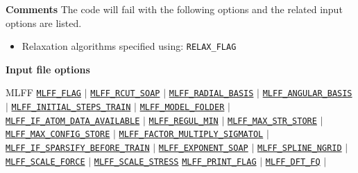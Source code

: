 \begin{frame}[allowframebreaks]{\textbf{Comments}} \label{Introduction}
The code will fail with the following options and the related input options are listed.
\begin{itemize}
  \item Relaxation algorithms specified using: \texttt{RELAX\_FLAG}
\end{itemize}

\end{frame}

\begin{frame}[allowframebreaks]{\textbf{Input file options}} \label{Index}
\vspace{-2mm}
 \begin{block}{MLFF}
\hyperlink{MLFF_FLAG}{\texttt{MLFF\_FLAG}} $\vert$
\hyperlink{MLFF_RCUT_SOAP}{\texttt{MLFF\_RCUT\_SOAP}} $\vert$
\hyperlink{MLFF_RADIAL_BASIS}{\texttt{MLFF\_RADIAL\_BASIS}} $\vert$ 
\hyperlink{MLFF_ANGULAR_BASIS}{\texttt{MLFF\_ANGULAR\_BASIS}} $\vert$ 
\hyperlink{MLFF_INITIAL_STEPS_TRAIN}{\texttt{MLFF\_INITIAL\_STEPS\_TRAIN}} $\vert$ 
\hyperlink{MLFF_MODEL_FOLDER}{\texttt{MLFF\_MODEL\_FOLDER}} $\vert$ 
\hyperlink{MLFF_IF_ATOM_DATA_AVAILABLE}{\texttt{MLFF\_IF\_ATOM\_DATA\_AVAILABLE}}  $\vert$ 
\hyperlink{MLFF_REGUL_MIN}{\texttt{MLFF\_REGUL\_MIN}} $\vert$
\hyperlink{MLFF_MAX_STR_STORE}{\texttt{MLFF\_MAX\_STR\_STORE}} $\vert$ 
\hyperlink{MLFF_MAX_CONFIG_STORE}{\texttt{MLFF\_MAX\_CONFIG\_STORE}} $\vert$ 
\hyperlink{MLFF_FACTOR_MULTIPLY_SIGMATOL}{\texttt{MLFF\_FACTOR\_MULTIPLY\_SIGMATOL}} $\vert$
\hyperlink{MLFF_IF_SPARSIFY_BEFORE_TRAIN}{\texttt{MLFF\_IF\_SPARSIFY\_BEFORE\_TRAIN}} $\vert$
\hyperlink{MLFF_EXPONENT_SOAP}{\texttt{MLFF\_EXPONENT\_SOAP}} $\vert$
\hyperlink{MLFF_SPLINE_NGRID}{\texttt{MLFF\_SPLINE\_NGRID}} $\vert$
\hyperlink{MLFF_SCALE_FORCE}{\texttt{MLFF\_SCALE\_FORCE}} $\vert$
\hyperlink{MLFF_SCALE_STRESS}{\texttt{MLFF\_SCALE\_STRESS}}
\hyperlink{MLFF_PRINT_FLAG}{\texttt{MLFF\_PRINT\_FLAG}} $\vert$
\hyperlink{MLFF_DFT_FQ}{\texttt{MLFF\_DFT\_FQ}} $\vert$ 
\end{block}

\end{frame}
